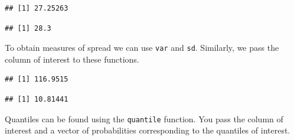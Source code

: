 \documentclass[
]{book}
\newenvironment{Shaded}{\begin{snugshade}}{\end{snugshade}}
\newcommand{\CommentTok}[1]{\textcolor[rgb]{0.56,0.35,0.01}{\textit{#1}}}
\newcommand{\DataTypeTok}[1]{\textcolor[rgb]{0.13,0.29,0.53}{#1}}
\newcommand{\FloatTok}[1]{\textcolor[rgb]{0.00,0.00,0.81}{#1}}
\newcommand{\KeywordTok}[1]{\textcolor[rgb]{0.13,0.29,0.53}{\textbf{#1}}}
\newcommand{\NormalTok}[1]{#1}
\newcommand{\OperatorTok}[1]{\textcolor[rgb]{0.81,0.36,0.00}{\textbf{#1}}}
\theoremstyle{definition}
\theoremstyle{definition}
\theoremstyle{definition}
\theoremstyle{remark}
\begin{document}
\begin{Shaded}
\end{Shaded}

\begin{verbatim}
## [1] 27.25263
\end{verbatim}

\begin{Shaded}
\end{Shaded}

\begin{verbatim}
## [1] 28.3
\end{verbatim}

To obtain measures of spread we can use \texttt{var} and \texttt{sd}. Similarly, we pass the column of interest to these functions.

\begin{Shaded}
\end{Shaded}

\begin{verbatim}
## [1] 116.9515
\end{verbatim}

\begin{Shaded}
\end{Shaded}

\begin{verbatim}
## [1] 10.81441
\end{verbatim}

Quantiles can be found using the \texttt{quantile} function. You pass the column of interest and a vector of probabilities corresponding to the quantiles of interest.

\begin{Shaded}
\end{Shaded}
\end{document}
